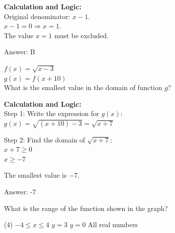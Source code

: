 \documentclass[11pt,paper=a4,answers]{exam}
\begin{document}
\begin{questions}
\begin{solution}
\vspace{30pt}

\textbf{Calculation and Logic:} \\
Original denominator: $x - 1$. \\
$x - 1 = 0 \Rightarrow x = 1$. \\
The value $x=1$ must be excluded.

\vspace{30pt}

Answer: \colorbox{yellow!100}{B}
\end{solution}

\vspace{40pt}

\question
$f(x) = \sqrt{x - 3}$ \\
$g(x) = f(x + 10)$ \\
What is the smallest value in the domain of function $g$?

\begin{solution}
\textbf{Calculation and Logic:} \\
Step 1: Write the expression for $g(x)$: \\
$g(x) = \sqrt{(x + 10) - 3} = \sqrt{x + 7}$

\vspace{15pt}

Step 2: Find the domain of $\sqrt{x + 7}$: \\
$x + 7 \geq 0$ \\
$x \geq -7$

\vspace{15pt}

The smallest value is $-7$.

\vspace{30pt}

Answer: \colorbox{yellow!100}{-7}
\end{solution}

\vspace{40pt}

\question
\begin{center}
\end{center}
What is the range of the function shown in the graph?
\begin{tasks}(4)
    \task $-4 \leq x \leq 4$
    \task $y = 3$
    \task $y = 0$
    \task All real numbers
\end{tasks}


\end{questions}
\end{document}

